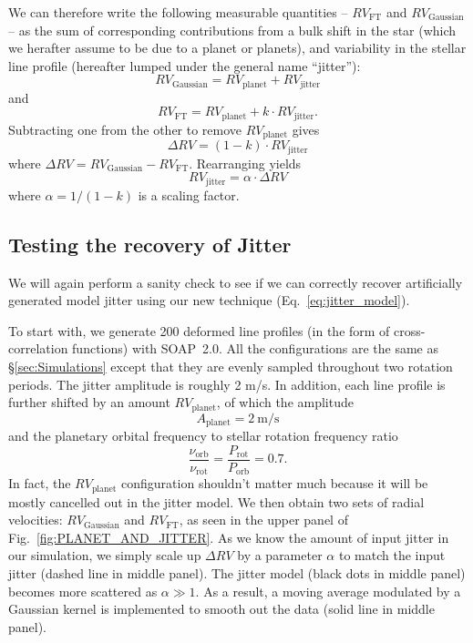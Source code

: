 We can therefore write the following measurable quantities -- $RV_\text{FT}$ and $RV_\text{Gaussian}$ --
as the sum of corresponding contributions from a bulk shift in the star (which
we herafter assume to be due to a planet or planets), and variability in the stellar line
profile (hereafter lumped under the general name ``jitter''):
\begin{equation}
	RV_\text{Gaussian} = RV_\text{planet} + RV_\text{jitter}
\label{eq:RV_Gaussian}
\end{equation}
and
\begin{equation}
	RV_\text{FT} = RV_\text{planet} + k \cdot RV_\text{jitter}. 
\label{eq:RV_FT}
\end{equation}
Subtracting one from the other to remove $RV_\text{planet}$ gives
\begin{equation}
	\Delta RV = (1-k) \cdot RV_\text{jitter}
\end{equation}
where $\Delta RV = RV_\text{Gaussian} - RV_\text{FT}$. Rearranging yields 
\begin{equation}
	RV_\text{jitter} = \alpha \cdot \Delta RV
\label{eq:jitter_model}
\end{equation}
where $\alpha = 1/(1-k)$ is a scaling factor.  


\subsection{Testing the recovery of Jitter}
\label{sec:check}

We will again perform a sanity check to see if we can correctly recover artificially generated model jitter
using our new technique (Eq.~\ref{eq:jitter_model}). 

To start with, we generate 200 deformed line profiles (in the form of cross-correlation functions) with SOAP~2.0.
All the configurations are the same as \S\ref{sec:Simulations} except that they are evenly sampled throughout two
rotation periods. The jitter amplitude is roughly 2 m/s. 
In addition, each line profile is further shifted by an amount $RV_\text{planet}$, of which the amplitude
\begin{equation*}
	A_\text{planet} = 2~\text{m/s}
\end{equation*}
and the planetary orbital frequency to stellar rotation frequency ratio
\begin{equation*}
	\frac{\nu_\text{orb}}{\nu_\text{rot}} = \frac{P_\text{rot}}{P_\text{orb}} = 0.7.
\end{equation*}
In fact, the $RV_\text{planet}$ configuration shouldn't matter much 
because it will be mostly cancelled out in the jitter model. We then obtain two sets of radial velocities: 
$RV_\text{Gaussian}$ and $RV_\text{FT}$, as seen in the upper panel of Fig.~\ref{fig:PLANET_AND_JITTER}. 
As we know the amount of input jitter in our simulation, we simply scale up $\Delta RV$ by a parameter $\alpha$
to match the input jitter (dashed line in middle panel). 
The jitter model (black dots in middle panel) becomes more scattered as $\alpha \gg 1$.  
As a result, a moving average modulated by a Gaussian kernel is implemented to smooth out the data (solid line 
in middle panel).

